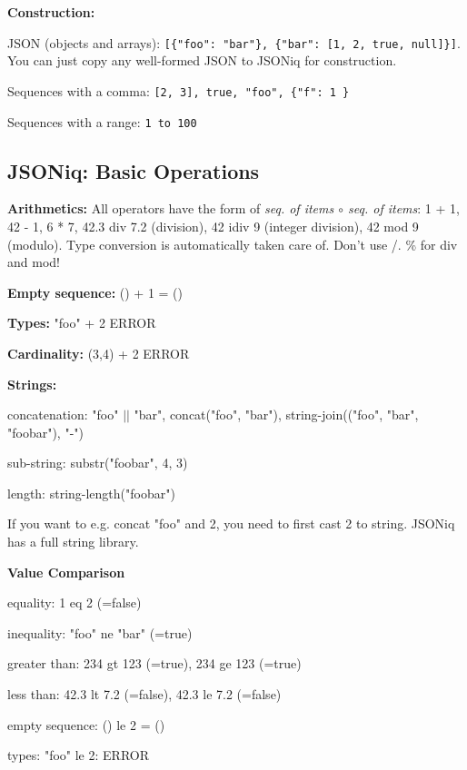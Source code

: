 \documentclass[11pt,oneside,a4paper]{article}
\begin{document}
{\textbf{Construction:}
\begin{compactitem}
\item JSON (objects and arrays): \texttt{[\{"foo": "bar"\}, \{"bar": [1, 2, true, null]\}]}. You can just copy any well-formed JSON to JSONiq for construction.
\item Sequences with a comma: \texttt{[2, 3], true, "foo", \{"f": 1 \}}
\item Sequences with a range: \texttt{1 to 100}
\end{compactitem}

\subsection{JSONiq: Basic Operations}

\textbf{Arithmetics:} All operators have the form of \textit{seq. of items $\circ$ seq. of items}: 1 + 1, 42 - 1, 6 * 7, 42.3 div 7.2 (division), 42 idiv 9 (integer division), 42 mod 9 (modulo). Type conversion is automatically taken care of. Don't use /. \% for div and mod!

\textbf{Empty sequence:} () + 1 = ()

\textbf{Types:} "foo" + 2 ERROR

\textbf{Cardinality:} (3,4) + 2 ERROR

\textbf{Strings:}
\begin{compactitem}
\item concatenation: "foo" $||$ "bar", concat("foo", "bar"), string-join(("foo", "bar", "foobar"), "-")
\item sub-string: substr("foobar", 4, 3)
\item length: string-length("foobar")
\end{compactitem}

If you want to e.g. concat "foo" and 2, you need to first cast 2 to string. JSONiq has a full string library.

\textbf{Value Comparison}
\begin{compactitem}
\item equality: 1 eq 2 (=false)
\item inequality: "foo" ne "bar" (=true)
\item greater than: 234 gt 123 (=true), 234 ge 123 (=true)
\item less than: 42.3 lt 7.2 (=false), 42.3 le 7.2 (=false)
\item empty sequence: () le 2 = ()
\item types: "foo" le 2: ERROR
\end{compactitem}

}
\end{document}
